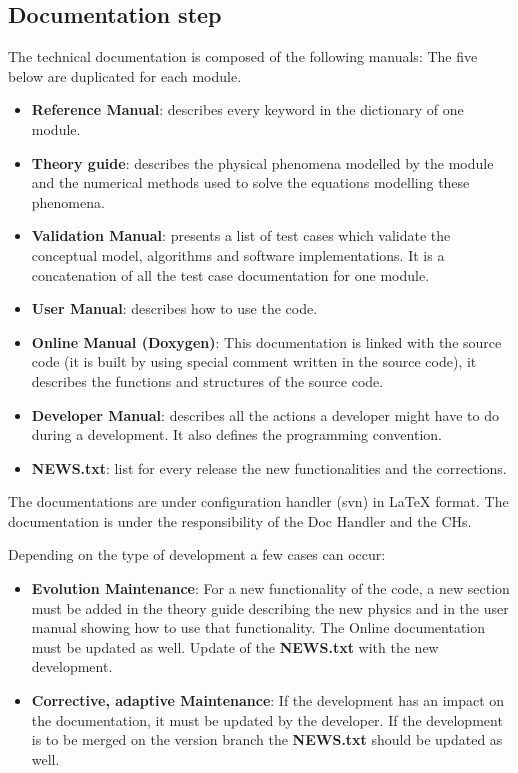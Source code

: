 \subsection{Documentation step}

The \telemacsystem{} technical documentation is composed of the following manuals:
The five below are duplicated for each \telemacsystem{} module.
\begin{itemize}
\item \textbf{Reference Manual}: describes every keyword in the dictionary of
  one module.
\item \textbf{Theory guide}: describes the physical phenomena modelled by the
  module and the numerical methods used to solve the equations modelling these
  phenomena.
\item \textbf{Validation Manual}: presents a list of test cases which validate
  the conceptual model, algorithms and software implementations. It is a
  concatenation of all the test case documentation for one module.
\item \textbf{User Manual}: describes how to use the code.
\end{itemize}

\begin{itemize}
\item \textbf{Online Manual (Doxygen)}: This documentation is linked with the
  source code (it is built by using special comment written in the source code),
  it describes the functions and structures of the source code.
\item \textbf{Developer Manual}: describes all the actions a developer might
  have to do during a development. It also defines the programming convention.
\item \textbf{NEWS.txt}: list for every release the new functionalities and the
  corrections.
\end{itemize}

The documentations are under configuration handler (svn) in \LaTeX\xspace
format. The documentation is under the responsibility of the Doc Handler and
the CHs.

Depending on the type of development a few cases can occur:
\begin{itemize}
\item \textbf{Evolution Maintenance}: For a new functionality of the code, a
  new section must be added in the theory guide describing the new physics and
  in the user manual showing how to use that functionality. The Online
  documentation must be updated as well. Update of the \textbf{NEWS.txt} with
  the new development.
\item \textbf{Corrective, adaptive Maintenance}: If the development has an
  impact on the documentation, it must be updated by the developer. If the
  development is to be merged on the version branch the \textbf{NEWS.txt}
  should be updated as well.
\end{itemize}

